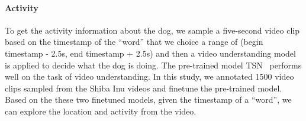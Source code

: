 \paragraph{Activity} To get the activity information about the dog, we sample a five-second video clip based on the timestamp of the ``word'' that we choice a range of (begin timestamp  - 2.5s, end timestamp + 2.5s) and then a video understanding model is applied to decide what the dog is doing. The pre-trained model TSN~\cite{wang2018temporal} performs well on 
the task of video understanding. In this study, we annotated 1500 video clips sampled from the Shiba Inu videos and finetune the pre-trained model. 
Based on the these two finetuned models, given the timestamp of a ``word'', 
we can explore the location and activity from the video.

